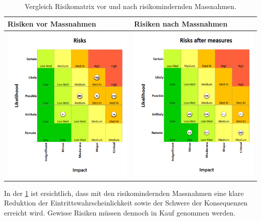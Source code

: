 \documentclass[../main.tex]{subfiles}
\begin{document}
\newpage
\begin{table}[H]
\centering
\begin{tabular}{|l|l|}
\hline
\textbf{Risiken vor Massnahmen} & \textbf{Risiken nach Massnahmen} \\ \hline
 \includegraphics[width=8cm]{img/Risikomatrix/Risks_before_measures_v_pren1.png}        & \includegraphics[width=8cm]{img/Risikomatrix/Risks_after_measures_v_pren1.png} \\ \hline
 
\end{tabular}
\caption{Vergleich Risikomatrix vor und nach risikomindernden Massnahmen.}
\label{tab:risikografik}
\end{table}

In der \ref{tab:risikografik} ist ersichtlich, dass mit den risikomindernden Massnahmen eine klare Reduktion der Eintrittswahrscheinlichkeit sowie der Schwere der Konsequenzen erreicht wird. Gewisse Risiken müssen dennoch in Kauf genommen werden.
\end{document}
